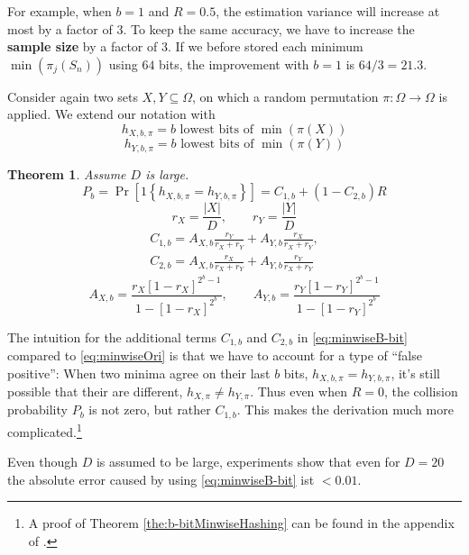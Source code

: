 \documentclass[a4paper]{article}
\newtheorem{mytheorem}{Theorem}
\begin{document}
For example, when $b=1$ and $R=0.5$, the estimation variance will increase at most by a factor of $3$. To keep the same accuracy, we have to increase the \textbf{sample size} by a factor of $3$. If we before stored each minimum $\min(\pi_j(S_n))$ using $64$ bits, the improvement with $b=1$ is $64/3=21.3$.

Consider again two sets $X,Y \subseteq \Omega$, on which a random permutation $\pi: \Omega \longrightarrow \Omega$ is applied. We extend our notation with
\[
h_{X,b,\pi}=b \text{ lowest bits of } \min(\pi(X))
\]
\[
h_{Y,b,\pi}=b \text{ lowest bits of } \min(\pi(Y))
\]
\begin{framed}
\begin{mytheorem} \label{the:b-bitMinwiseHashing}
Assume $D$ is large.
\begin{equation}\label{eq:minwiseB-bit}
P_b=\Pr[1\left\lbrace h_{X,b,\pi}=h_{Y,b,\pi}\right\rbrace]=C_{1,b}+(1-C_{2,b})R
\end{equation}
\begin{equation}
r_X=\frac{|X|}{D}, \qquad r_Y=\frac{|Y|}{D}
\end{equation}
\begin{equation}
\begin{split}
C_{1,b}=A_{X,b}\frac{r_Y}{r_X+r_Y}+A_{Y,b}\frac{r_X}{r_X+r_Y},\\
C_{2,b}=A_{X,b}\frac{r_X}{r_X+r_Y}+A_{Y,b}\frac{r_Y}{r_X+r_Y}
\end{split}
\end{equation}
\begin{equation}
A_{X,b}=\frac{r_X[1-r_X]^{2^b-1}}{1-[1-r_X]^{2^b}}, \qquad A_{Y,b}=\frac{r_Y[1-r_Y]^{2^b-1}}{1-[1-r_Y]^{2^b}}
\end{equation}
\end{mytheorem}
\end{framed}

The intuition for the additional terms $C_{1,b}$ and $C_{2,b}$ in \vref{eq:minwiseB-bit} compared to \vref{eq:minwiseOri} is that we have to account for a type of ``false positive'': When two minima agree on their last $b$ bits, $h_{X,b,\pi}=h_{Y,b,\pi}$, it's still possible that their are different, $h_{X,\pi}\neq h_{Y,\pi}$. Thus even when $R=0$, the collision probability $P_b$ is not zero, but rather $C_{1,b}$. This makes the derivation much more complicated.\footnote{A proof of Theorem \vref{the:b-bitMinwiseHashing} can be found in the appendix of \citep{LiK09}.}

Even though $D$ is assumed to be large, experiments show that even for $D=20$ the absolute error caused by using \vref{eq:minwiseB-bit} ist $< 0.01$.
\end{document}
